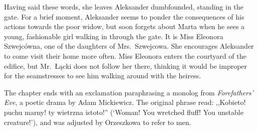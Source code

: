 Having said these words, she leaves Aleksander dumbfounded, standing in the gate.
For a brief moment, Aleksander seems to ponder the consequences of his actions towards the poor widow, but soon forgets about Marta when he sees a young, fashionable girl walking in through the gate.
It is Miss Eleonora Szwejcówna, one of the daughters of Mrs.\ Szwejcowa.
She encourages Aleksander to come visit their home more often.
Miss Eleonora enters the courtyard of the edifice, but Mr.\ Łącki does not follow her there, thinking it would be improper for the seamstresses to see him walking around with the heiress.

The chapter ends with an exclamation paraphrasing a monolog from \textit{Forefathers' Eve}, a poetic drama by Adam Mickiewicz. The original phrase read: ,,Kobieto! puchu marny! ty wietrzna istoto!'' (`Woman! You wretched fluff! You unstable creature!'), and was adjusted by Orzeszkowa to refer to men.
